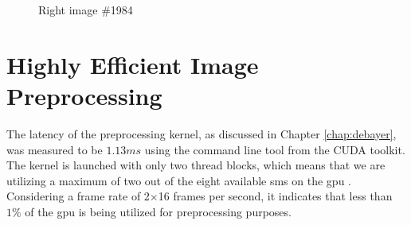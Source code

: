 \begin{figure}[H]
    \centering
    \caption{Right image \#1984}
    \label{fig:picture_1984}
\end{figure}

\section{Highly Efficient Image Preprocessing}
The latency of the preprocessing kernel, as discussed in Chapter \ref{chap:debayer}, was measured to be $1.13ms$ using the  command line tool from the CUDA toolkit. The kernel is launched with only two thread blocks, which means that we are utilizing a maximum of two out of the eight available \glspl{sm} on the \gls{gpu} \cite{rigerunNVIDIAJetsonXavier2023}. Considering a frame rate of 2$\times$16 frames per second, it indicates that less than $1\%$ of the \gls{gpu} is being utilized for preprocessing purposes.

